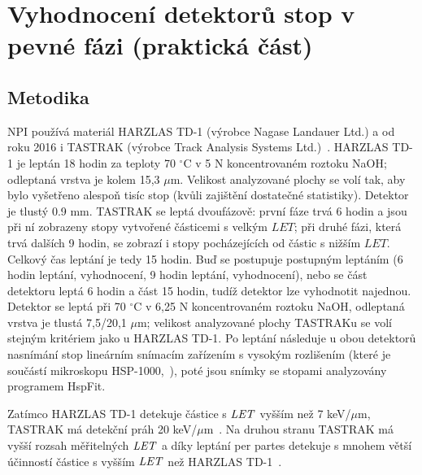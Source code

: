 \chapter{Vyhodnocení detektorů stop v pevné fázi (praktická část)}
\section{Metodika}\label{sec:praktickaCast_metodika}
NPI používá materiál HARZLAS TD-1 (výrobce Nagase Landauer Ltd.) a od roku 2016 i TASTRAK (výrobce Track Analysis Systems Ltd.)~\cite{cesky}. HARZLAS TD-1 je leptán 18 hodin za teploty 70 $^{\circ}$C v 5 N koncentrovaném roztoku NaOH; odleptaná vrstva je kolem 15,3 $\mu$m. Velikost analyzované plochy se volí tak, aby bylo vyšetřeno alespoň tisíc stop (kvůli zajištění dostatečné statistiky). Detektor je tlustý 0.9 mm. TASTRAK se leptá dvoufázově: první fáze trvá 6 hodin a jsou při ní zobrazeny stopy vytvořené částicemi s velkým $\mathit{LET}$; při druhé fázi, která trvá dalších 9 hodin, se zobrazí i stopy pocházejících od částic s nižším $\mathit{LET}$. Celkový čas leptání je tedy 15 hodin. Buď se postupuje postupným leptáním (6 hodin leptání, vyhodnocení, 9 hodin leptání, vyhodnocení), nebo se část detektoru leptá 6 hodin a část 15 hodin, tudíž
detektor lze vyhodnotit najednou. Detektor se leptá při 70 $^{\circ}$C v 6,25 N koncentrovaném roztoku NaOH, odleptaná vrstva je tlustá 7,5/20,1 $\mu$m; velikost analyzované plochy TASTRAKu se volí stejným kritériem jako u HARZLAS TD-1. Po leptání následuje u obou detektorů nasnímání stop lineárním snímacím zařízením s vysokým rozlišením (které je součástí mikroskopu HSP-1000,~\cite{dosis_HSP1000}), poté jsou snímky se stopami analyzovány programem HspFit.

Zatímco HARZLAS TD-1 detekuje částice s $\mathit{LET}$ vyšším než 7 keV/$\mu$m, TASTRAK má detekční práh 20 keV/$\mu$m~\cite{cesky,thesisKPBrabcova}. Na druhou stranu TASTRAK má vyšší rozsah měřitelných $\mathit{LET}$ a díky leptání per partes detekuje s mnohem větší účinností částice s vyšším $\mathit{LET}$ než HARZLAS TD-1~\cite{cesky}.
\newpage
